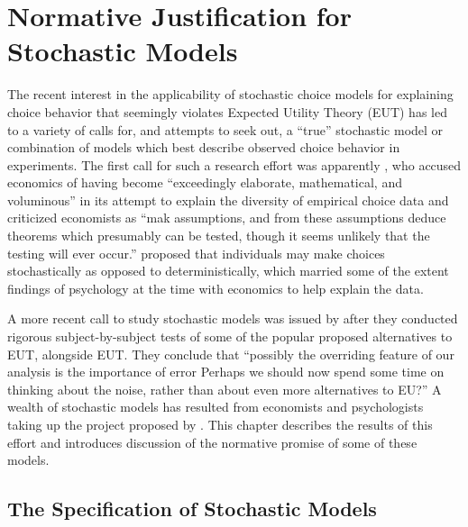 \documentclass[../main.tex]{subfiles}
\begin{document}
\onehalfspacing
\setcounter{chapter}{1}
\chapter{Normative Justification for Stochastic Models}

\lltoc

The recent interest in the applicability of stochastic choice models for explaining choice behavior that seemingly violates Expected Utility Theory (EUT) has led to a variety of calls for, and attempts to seek out, a \enquote{true} stochastic model or combination of  models which best describe observed choice behavior in experiments.
The first call for such a research effort was apparently \textcite{Edwards1954}, who accused economics of having become \enquote{exceedingly elaborate, mathematical, and voluminous} \textcite[380]{Edwards1954} in its attempt to explain the diversity of empirical choice data and criticized economists as \enquote{mak assumptions, and from these assumptions \textelp{} deduce theorems which presumably can be tested, though it seems unlikely that the testing will ever occur.}
\textcite{Edwards1954} proposed that individuals may make choices stochastically as opposed to deterministically, which married some of the extent findings of psychology at the time with economics to help explain the data.

A more recent call to study stochastic models was issued by \textcite[1321]{Hey1994} after they conducted rigorous subject-by-subject tests of some of the popular proposed alternatives to EUT, alongside EUT.
They conclude that \enquote{possibly the overriding feature of our analysis is the importance of error \textelp{} Perhaps we should now spend some time on thinking about the noise, rather than about even more alternatives to EU?}
A wealth of stochastic models has resulted from economists and psychologists taking up the project proposed by \textcite{Hey1994}.
This chapter describes the results of this effort and introduces discussion of the normative promise of some of these models.

\section{The Specification of Stochastic Models}
\end{document}
